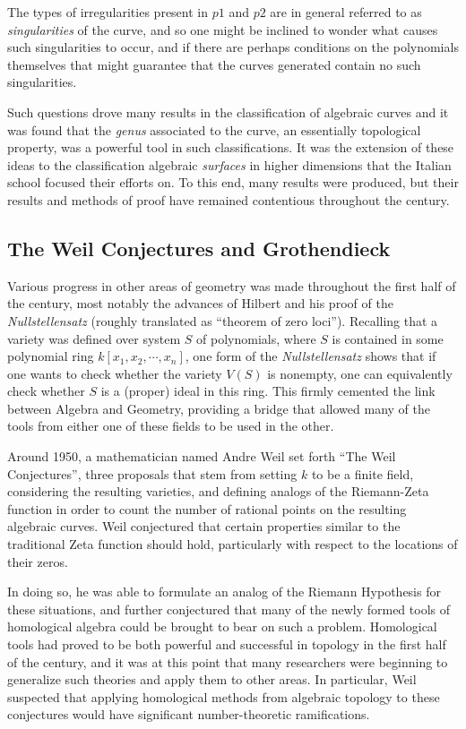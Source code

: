 \documentclass{article}
\theoremstyle{definition}
\begin{document}
The types of irregularities present in $p1$ and $p2$ are in general referred to as \emph{singularities} of the curve,
and so
one might be inclined to wonder what causes such singularities to occur,
and if there are perhaps conditions on the polynomials themselves that
might guarantee that the curves generated contain no such singularities.

Such questions drove many results in the classification of algebraic
curves and it was found that the \emph{genus} associated to the curve, an essentially topological property, was a powerful tool in such classifications. It was the extension of these ideas to the classification algebraic \emph{surfaces} in higher dimensions that the
Italian school focused their efforts on. To this end, many results were
produced, but their results and methods of proof have remained
contentious throughout the  century.

\subsection{The Weil Conjectures and Grothendieck}\label{header-n127}

Various progress in other areas of geometry was made throughout the
first half of the  century, most notably the advances of Hilbert and
his proof of the \emph{Nullstellensatz} (roughly translated as ``theorem
of zero loci''). Recalling that a variety was defined over system \(S\)
of polynomials, where \(S\) is contained in some polynomial ring
\(k[x_1, x_2, \cdots, x_n]\), one form of the \emph{Nullstellensatz}
shows that if one wants to check whether the variety \(V(S)\) is
nonempty, one can equivalently check whether \(S\) is a (proper) ideal
in this ring. This firmly cemented the link between Algebra and
Geometry, providing a bridge that allowed many of the tools from either
one of these fields to be used in the other.

Around 1950, a mathematician named Andre Weil set forth ``The Weil
Conjectures'', three proposals that stem from setting \(k\) to be a
finite field, considering the resulting varieties, and defining analogs
of the Riemann-Zeta function in order to count the number of rational
points on the resulting algebraic curves. Weil conjectured that certain
properties similar to the traditional Zeta function should hold,
particularly with respect to the locations of their zeros.

In doing so, he was able to formulate an analog of the Riemann
Hypothesis for these situations, and further conjectured that many of the
newly formed tools of homological algebra could be brought to bear on
such a problem. Homological tools had proved to be both powerful and
successful in topology in the first half of the century, and it was at
this point that many researchers were beginning to generalize such
theories and apply them to other areas. In particular, Weil suspected
that applying homological methods from algebraic topology to these
conjectures would have significant number-theoretic ramifications.
\end{document}
